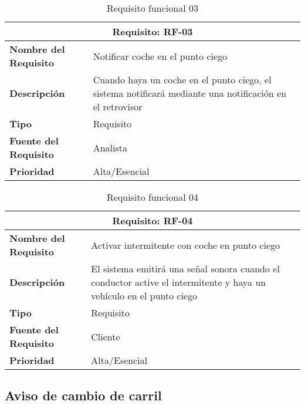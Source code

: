 \documentclass[10pt,a4paper,oldfontcommands]{dpds}
\begin{document}
\begin{table}[h]
\begin{center}
\begin{tabular}{p{} p{7cm}}
\multicolumn{2}{c}{\textbf{Requisito: RF-03} } \\
\hline \hline
\textbf{Nombre del Requisito} & Notificar coche en el punto ciego \\
\textbf{Descripción} & Cuando haya un coche en el punto ciego, el sistema notificará mediante una notificación en el retrovisor \\
\textbf{Tipo} & Requisito  \\
\textbf{Fuente del Requisito} & Analista  \\
\textbf{Prioridad} & Alta/Esencial  \\ \hline
\end{tabular}
\caption{Requisito funcional 03}
\label{tab:personal}
\end{center}
\end{table}

\begin{table}[h]
\begin{center}
\begin{tabular}{p{} p{7cm}}
\multicolumn{2}{c}{\textbf{Requisito: RF-04} } \\
\hline \hline
\textbf{Nombre del Requisito} & Activar intermitente con coche en punto ciego  \\
\textbf{Descripción} &  El sistema emitirá una señal sonora cuando el conductor active el intermitente y haya un vehículo en el punto ciego \\
\textbf{Tipo} & Requisito  \\
\textbf{Fuente del Requisito} & Cliente  \\
\textbf{Prioridad} & Alta/Esencial  \\ \hline
\end{tabular}
\caption{Requisito funcional 04}
\label{tab:personal}
\end{center}
\end{table}

\subsection{Aviso de cambio de carril}
\end{document}
